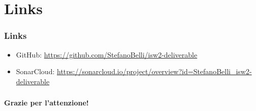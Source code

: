 \documentclass{beamer}
\begin{document}
\section{Links}
\begin{frame}
	\frametitle{Links}
	
	\begin{itemize}
		\item GitHub: \url{https://github.com/StefanoBelli/isw2-deliverable}
		\item SonarCloud: \url{https://sonarcloud.io/project/overview?id=StefanoBelli_isw2-deliverable}
	\end{itemize}
	
\end{frame}

\begin{frame}
    \frametitle{}
    
    \fontsize{30pt}{10pt}\selectfont
    \centering
    \textbf{Grazie per l'attenzione!}
    
\end{frame}
\end{document}
